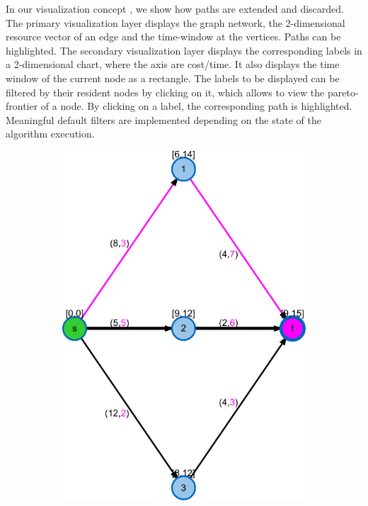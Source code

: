 
In our visualization concept , we show how paths are extended and discarded. The primary visualization layer displays the graph network, the 2-dimensional resource vector of an edge and the time-window at the vertices. Paths can be highlighted. The secondary visualization layer displays the corresponding labels in a 2-dimensional chart, where the axis are cost/time. It also displays the time window of the current node as a rectangle. The labels to be displayed can be filtered by their resident nodes by clicking on it, which allows to view the pareto-frontier of a node. By clicking on a label, the corresponding path is highlighted. Meaningful default filters are implemented depending on the state of the algorithm execution.
\begin{figure}
\centering
\begin{subfigure}[t]{0.45\textwidth}
\includegraphics[width=\textwidth]{fig/spp-rc-graph-algorithm-graph}

\end{subfigure}
\end{figure}
